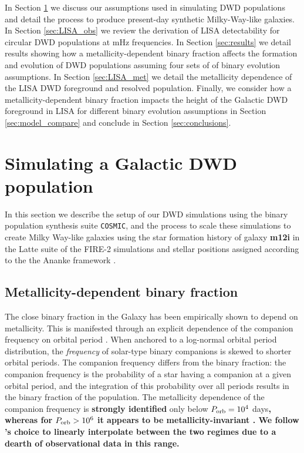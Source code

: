 \documentclass[twocolumn, linenumbers]{aastex631}
\newcommand{\cosmic}{\texttt{COSMIC}}
\begin{document}
In Section \ref{sec:simulations} we discuss our assumptions used in simulating DWD populations and detail the process to produce present-day synthetic Milky-Way-like galaxies. In Section \ref{sec:LISA_obs} we review the derivation of LISA detectability for circular DWD populations at mHz frequencies. In Section \ref{sec:results} we detail results showing how a metallicity-dependent binary fraction affects the formation and evolution of DWD populations assuming four sets of of binary evolution assumptions. In Section \ref{sec:LISA_met} we detail the metallicity dependence of the LISA DWD foreground and resolved population. Finally, we consider how a metallicity-dependent binary fraction impacts the height of the Galactic DWD foreground in LISA for different binary evolution assumptions in Section \ref{sec:model_compare} and conclude in Section \ref{sec:conclusions}.  

\section{Simulating a Galactic DWD population}\label{sec:simulations}
In this section we describe the setup of our DWD simulations using the binary population synthesis suite \cosmic, and the process to scale these simulations to create Milky Way-like galaxies using the star formation history of galaxy \textbf{m12i} in the Latte suite of the FIRE-2 simulations \citep{Wetzel2016, Hopkins2018} and stellar positions assigned according to the the Ananke framework \citep{Sanderson2020}. 

\subsection{Metallicity-dependent binary fraction}\label{subsec:metbinfrac}
The close binary fraction in the Galaxy has been empirically shown to depend on metallicity. This is manifested through an explicit dependence of the companion frequency on orbital period \citep{Moe2021}. When anchored to a log-normal orbital period distribution, the \emph{frequency} of solar-type binary companions is skewed to shorter orbital periods. The companion frequency differs from the binary fraction: the companion frequency is the probability of a star having a companion at a given orbital period, and the integration of this probability over all periods results in the binary fraction of the population. The metallicity dependence of the companion frequency is \textbf{strongly identified} only below $P_{\rm{orb}}=10^4$ days\textbf{, whereas for $P_{\rm{orb}}>10^6$ it appears to be metallicity-invariant \citep{Moe2019}. We follow \citet{Moe2019}'s choice to linearly interpolate between the two regimes due to a dearth of observational data in this range.}
\end{document}
